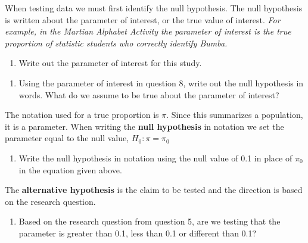 \documentclass[
]{report}
\providecommand{\tightlist}{%
  \setlength{\itemsep}{0pt}\setlength{\parskip}{0pt}}
\begin{document}
When testing data we must first identify the null hypothesis. The null hypothesis is written about the parameter of interest, or the true value of interest. \emph{For example, in the Martian Alphabet Activity the parameter of interest is the true proportion of statistic students who correctly identify Bumba.}

\begin{enumerate}
\def\labelenumi{\arabic{enumi}.}
\setcounter{enumi}{7}
\tightlist
\item
  Write out the parameter of interest for this study.
\end{enumerate}

\vspace{0.8in}

\begin{enumerate}
\def\labelenumi{\arabic{enumi}.}
\setcounter{enumi}{8}
\tightlist
\item
  Using the parameter of interest in question 8, write out the null hypothesis in words. What do we assume to be true about the parameter of interest?
\end{enumerate}

\newpage

The notation used for a true proportion is \(\pi\). Since this summarizes a population, it is a parameter. When writing the \textbf{null hypothesis} in notation we set the parameter equal to the null value, \(H_0: \pi = \pi_0\)

\begin{enumerate}
\def\labelenumi{\arabic{enumi}.}
\setcounter{enumi}{9}
\tightlist
\item
  Write the null hypothesis in notation using the null value of 0.1 in place of \(\pi_0\) in the equation given above.
\end{enumerate}

\vspace{0.5in}

The \textbf{alternative hypothesis} is the claim to be tested and the direction is based on the research question.

\begin{enumerate}
\def\labelenumi{\arabic{enumi}.}
\setcounter{enumi}{10}
\tightlist
\item
  Based on the research question from question 5, are we testing that the parameter is greater than 0.1, less than 0.1 or different than 0.1?
\end{enumerate}

\vspace{0.5in}
\end{document}
